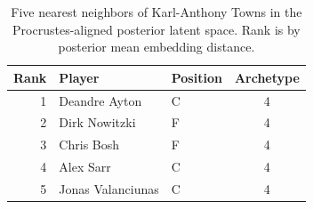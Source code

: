 \begin{table}[htbp]
  \centering\small
  \begin{tabular}{rllc}
    \toprule
    Rank & Player & Position & Archetype \\
    \midrule
    1 & Deandre Ayton & C & 4 \\
    2 & Dirk Nowitzki & F & 4 \\
    3 & Chris Bosh & F & 4 \\
    4 & Alex Sarr & C & 4 \\
    5 & Jonas Valanciunas & C & 4 \\
    \bottomrule
  \end{tabular}
  \caption{Five nearest neighbors of Karl-Anthony Towns in the Procrustes-aligned posterior latent space. Rank is by posterior mean embedding distance.}
  \label{tab:Karl_Anthony_Towns_neighbors}
\end{table}

